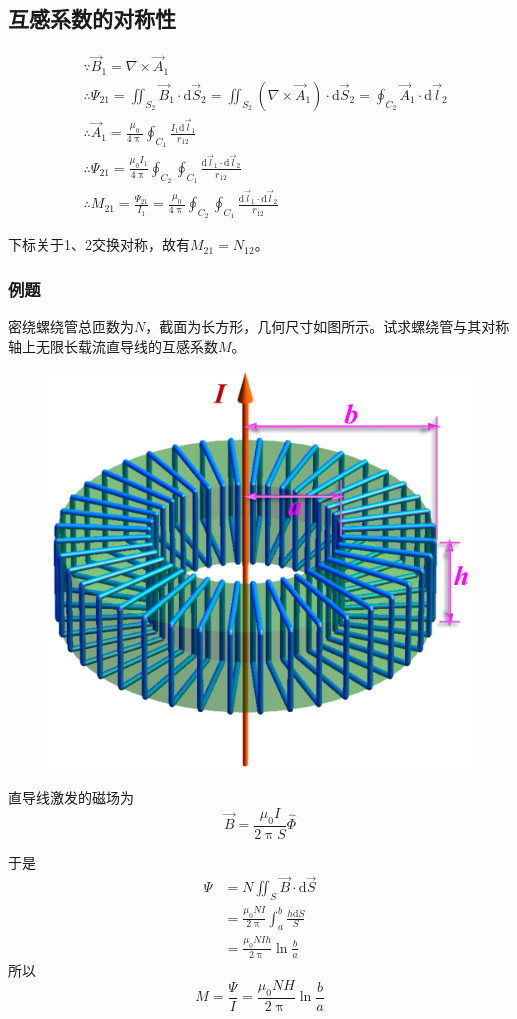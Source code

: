 \documentclass[12pt]{article}
\newcommand{\rmd}{\mathrm{d}}
\begin{document}
\subsection{互感系数的对称性}

\begin{equation*}
    \begin{aligned}
        & \because \overrightarrow{B}_1 = \nabla \times \overrightarrow{A}_1 \\
        & \therefore \varPsi_{21}=\iint_{S_2} \overrightarrow{B}_1 \cdot \rmd \overrightarrow{S}_2=\iint_{S_2}\left(\nabla \times \overrightarrow{A}_1\right) \cdot \rmd \overrightarrow{S}_2=\oint_{C_2} \overrightarrow{A}_1 \cdot \rmd \overrightarrow{l}_2 \\
        & \therefore \overrightarrow{A}_1=\frac{\mu_0}{4 \uppi} \oint_{C_1} \frac{I_1 \rmd \overrightarrow{l}_1}{r_{12}} \\
        & \therefore \varPsi_{21}=\frac{\mu_0 I_1}{4 \uppi} \oint_{C_2} \oint_{C_1} \frac{\rmd \overrightarrow{l}_1 \cdot \rmd \overrightarrow{l}_2}{r_{12}} \\
        & \therefore M_{21}=\frac{\Psi_{21}}{I_1}=\frac{\mu_0}{4 \uppi} \oint_{C_2} \oint_{C_1} \frac{\rmd \vec{l}_1 \cdot \rmd \vec{l}_2}{r_{12}}
    \end{aligned}
\end{equation*}

下标关于1、2交换对称，故有\(M_{21} = N_{12}\)。

\subsubsection{例题}

密绕螺绕管总匝数为\(N\)，截面为长方形，几何尺寸如图所示。试求螺绕管与其对称轴上无限长载流直导线的互感系数\(M\)。

\begin{figure}[!h]
    \centering
    \includegraphics[width = .25\textwidth]{graphics/互感例题.png}
\end{figure}

直导线激发的磁场为
\[
\overrightarrow{B} = \frac{\mu_0 I}{2 \uppi S} \hat{\varPhi}
\]

于是
\begin{equation*}
    \begin{aligned}
        \varPsi &= N \iint_S \overrightarrow{B} \cdot \rmd \overrightarrow{S} \\
        &= \frac{\mu_0 NI}{2 \uppi} \int_{a}^{b} \frac{h \rmd S}{S} \\
        &= \frac{\mu_0 NIh}{2 \uppi} \ln \frac{b}{a}
    \end{aligned}
\end{equation*}
所以
\begin{equation*}
    M = \frac{\varPsi}{I} = \frac{\mu_0 NH}{2 \uppi} \ln \frac{b}{a}
\end{equation*}
\end{document}
